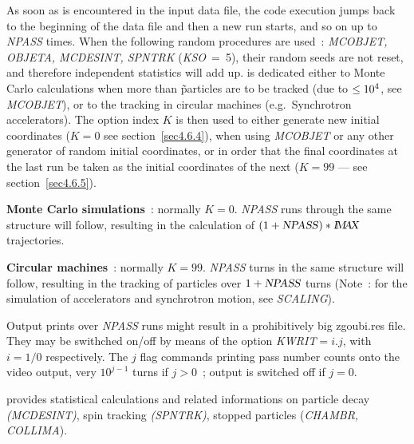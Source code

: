 As soon as \REBELOTE is encountered in the input data file,
the code execution jumps back to the beginning of the data file and then  a new
run starts, and so on up to \textsl{NPASS} times. When the following random procedures 
are used~: \textsl{MCOBJET, OBJETA, MCDESINT, 
SPNTRK}
\mbox{(\textsl{KSO} = 5)},
their random seeds are not reset, and therefore independent statistics 
will add up. \REBELOTE is dedicated either to Monte Carlo calculations when more 
than \imax\~particles are to be tracked (due to \mbox{\IMAX$\leq 10^4$}, 
see \textsl{MCOBJET}), 
or to the tracking in circular machines (e.g.~Synchrotron 
accelerators). The option index $ K $ is then used to either generate new 
initial coordinates ($ K=0 $ see section~\ref{sec4.6.4}), when using \textsl{MCOBJET}
 or
any other generator of random initial coordinates, or in order that the 
final coordinates at the last run be taken as the initial 
coordinates of the next  ($K=99 $ --- see section~\ref{sec4.6.5}).  
\bigskip

\noindent\textbf{Monte Carlo simulations}~: normally $ K=0$.  \textsl{NPASS} runs
through the same structure will follow, resulting in the calculation of 
$(1+\text{\textsl{NPASS}})  \ast  \text{\ensuremath{\textsl{I\!M\!A\!X }}}$ trajectories.  
\bigskip

\noindent\textbf{Circular machines}~: normally $ K=99$.  \textsl{NPASS} turns in
the same structure will follow, resulting in the tracking of \IMAX 
particles over $1+\text{\textsl{NPASS}}$ turns (Note~: for the simulation of 
accelerators and synchrotron motion, see \textsl{SCALING}). 
\bigskip

\noindent Output prints over \textsl{NPASS} runs might result in a
prohibitively big zgoubi.res file. They may be swithched on/off  by means of the option 
\mbox{\textsl{KWRIT}$= i.j$}, with $i=1/0$ respectively. The $j$ flag commands printing 
pass number counts  onto the video output, very $10^{j-1}$ turns if $j>0$~; output is switched  
off if $j=0$. 

  
\bigskip

\noindent\REBELOTE provides statistical calculations and related 
informations on particle decay \textsl{(MCDESINT)}, spin tracking  
\textsl{(SPNTRK)}, stopped particles (\textsl{CHAMBR,
 COLLIMA}). 
 \newpage

